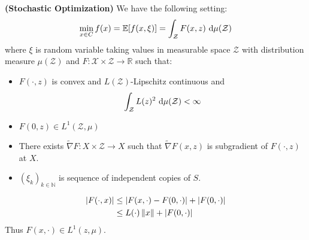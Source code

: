 \begin{remark}{\textbf{(Stochastic Optimization)}}
    We have the following setting:
    \begin{equation*}
        \min_{x\in C} f(x) = \mathbb{E}[f(x, \xi)] = \int_\mathcal{Z} F(x, z) \ \mathrm{d}\mu(\mathcal{Z})
    \end{equation*}
    where $\xi$ is random variable taking values in measurable space $\mathcal{Z}$ with distribution measure $\mu(\mathcal{Z})$ and $F:\mathcal{X}\times\mathcal{Z}\rightarrow \mathbb{R}$ such that:
    \begin{itemize}
        \item $F(\cdot, z)$ is convex and $L(\mathcal{Z})$-Lipschitz continuous and 
        \begin{equation*}
            \int_\mathcal{Z} L(z)^2\ \mathrm{d}\mu(\mathcal{Z} ) < \infty
        \end{equation*}
        \item $F(0, z) \in L^1(\mathcal{Z}, \mu)$
        \item There exists $\tilde{\nabla}F : X \times \mathcal{Z} \rightarrow X$ such that $\tilde{\nabla}F(x, z)$ is subgradient of $F(\cdot, z)$ at $X$.
        \item $(\xi_k)_{k\in\mathbb{N}}$ is sequence of independent copies of $S$.
    \end{itemize}
\end{remark}

\begin{remark}
    \begin{equation*}
    \begin{aligned}
        \left| F(\cdot, x) \right| &\le \left| F(x, \cdot)-F(0,\cdot) \right| + \left| F(0, \cdot) \right| \\
        &\le L(\cdot)\left\lVert x\right\rVert + \left| F(0,\cdot) \right|
    \end{aligned}
    \end{equation*}
    Thus $F(x, \cdot)\in L^1(z,\mu)$.
\end{remark}

